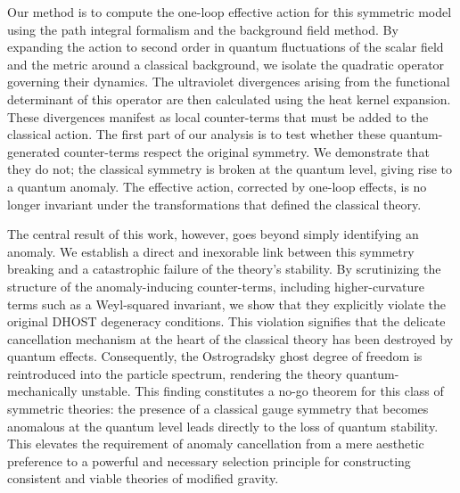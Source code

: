 \documentclass[twocolumn]{aastex631}
\begin{document}
Our method is to compute the one-loop effective action for this symmetric model using the path integral formalism and the background field method. By expanding the action to second order in quantum fluctuations of the scalar field and the metric around a classical background, we isolate the quadratic operator governing their dynamics. The ultraviolet divergences arising from the functional determinant of this operator are then calculated using the heat kernel expansion. These divergences manifest as local counter-terms that must be added to the classical action. The first part of our analysis is to test whether these quantum-generated counter-terms respect the original symmetry. We demonstrate that they do not; the classical symmetry is broken at the quantum level, giving rise to a quantum anomaly. The effective action, corrected by one-loop effects, is no longer invariant under the transformations that defined the classical theory.

The central result of this work, however, goes beyond simply identifying an anomaly. We establish a direct and inexorable link between this symmetry breaking and a catastrophic failure of the theory's stability. By scrutinizing the structure of the anomaly-inducing counter-terms, including higher-curvature terms such as a Weyl-squared invariant, we show that they explicitly violate the original DHOST degeneracy conditions. This violation signifies that the delicate cancellation mechanism at the heart of the classical theory has been destroyed by quantum effects. Consequently, the Ostrogradsky ghost degree of freedom is reintroduced into the particle spectrum, rendering the theory quantum-mechanically unstable. This finding constitutes a no-go theorem for this class of symmetric theories: the presence of a classical gauge symmetry that becomes anomalous at the quantum level leads directly to the loss of quantum stability. This elevates the requirement of anomaly cancellation from a mere aesthetic preference to a powerful and necessary selection principle for constructing consistent and viable theories of modified gravity.
\end{document}

